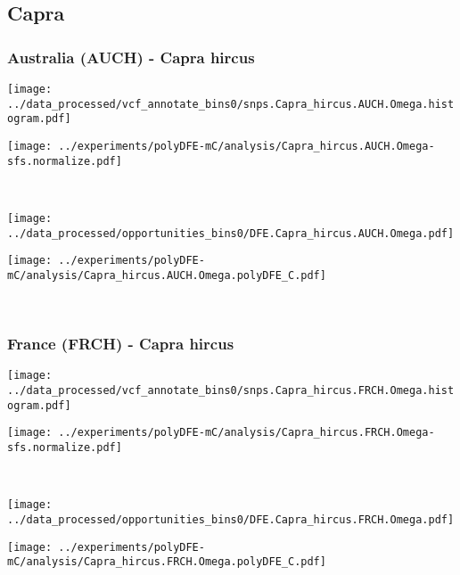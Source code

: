 \subsection{Capra}

\subsubsection{Australia (AUCH) - Capra hircus}

\begin{minipage}{0.49\linewidth}
    \texttt{[image: ../data\_processed/vcf\_annotate\_bins0/snps.Capra\_hircus.AUCH.Omega.histogram.pdf]}
\end{minipage}
\begin{minipage}{0.49\linewidth}
    \texttt{[image: ../experiments/polyDFE-mC/analysis/Capra\_hircus.AUCH.Omega-sfs.normalize.pdf]}
\end{minipage}
\\
\begin{minipage}{0.49\linewidth}
    \texttt{[image: ../data\_processed/opportunities\_bins0/DFE.Capra\_hircus.AUCH.Omega.pdf]}
\end{minipage}
\begin{minipage}{0.49\linewidth}
    \texttt{[image: ../experiments/polyDFE-mC/analysis/Capra\_hircus.AUCH.Omega.polyDFE\_C.pdf]}
\end{minipage}
\\

\subsubsection{France (FRCH) - Capra hircus}

\begin{minipage}{0.49\linewidth}
    \texttt{[image: ../data\_processed/vcf\_annotate\_bins0/snps.Capra\_hircus.FRCH.Omega.histogram.pdf]}
\end{minipage}
\begin{minipage}{0.49\linewidth}
    \texttt{[image: ../experiments/polyDFE-mC/analysis/Capra\_hircus.FRCH.Omega-sfs.normalize.pdf]}
\end{minipage}
\\
\begin{minipage}{0.49\linewidth}
    \texttt{[image: ../data\_processed/opportunities\_bins0/DFE.Capra\_hircus.FRCH.Omega.pdf]}
\end{minipage}
\begin{minipage}{0.49\linewidth}
    \texttt{[image: ../experiments/polyDFE-mC/analysis/Capra\_hircus.FRCH.Omega.polyDFE\_C.pdf]}
\end{minipage}
\\

